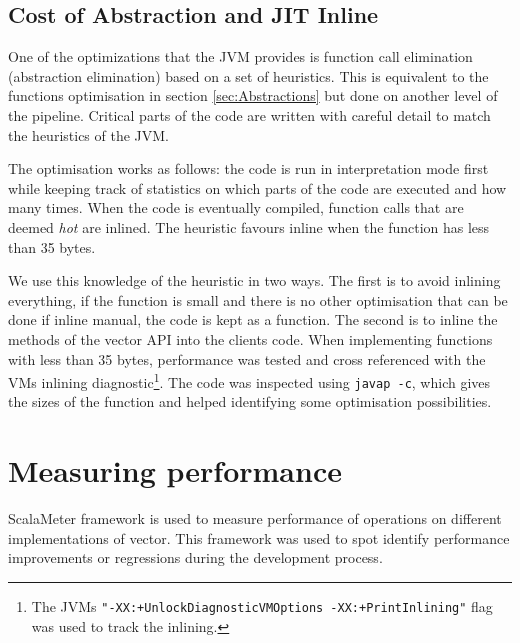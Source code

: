 \subsection{Cost of Abstraction and JIT Inline}
One of the optimizations that the JVM provides is function call elimination (abstraction elimination) based on a set of heuristics. This is equivalent to the functions optimisation in section \ref{sec:Abstractions} but done on another level of the pipeline. Critical parts of the code are written with careful detail to match the heuristics of the JVM.

The optimisation works as follows: the code is run in interpretation mode first while keeping track of statistics on which parts of the code are executed and how many times. When the code is eventually compiled, function calls that are deemed \emph{hot} are inlined. The heuristic favours inline when the function has less than 35 bytes. 

We use this knowledge of the heuristic in two ways. The first is to avoid inlining everything, if the function is small and there is no other optimisation that can be done if inline manual, the code is kept as a function. The second is to inline the methods of the vector API into the clients code. When implementing functions with less than 35 bytes, performance was tested and cross referenced with the VMs inlining diagnostic\footnote{The JVMs \texttt{"-XX:+UnlockDiagnosticVMOptions -XX:+PrintInlining"} flag was used to track the inlining.}. The code was inspected using \texttt{javap -c}, which gives the sizes of the function and helped identifying some optimisation possibilities.

\section{Measuring performance}
ScalaMeter framework\cite{scalameter} is used to measure performance of operations on different implementations of vector. This framework was used to spot identify performance improvements or regressions during the development process. 

